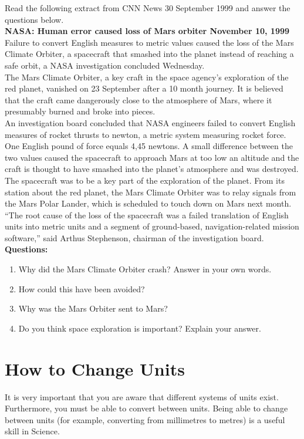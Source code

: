 {Read the following extract from CNN News 30 September 1999 and answer the questions below.\\

{\bf NASA: Human error caused loss of Mars orbiter November 10, 1999}\\

Failure to convert English measures to metric values caused the loss of the Mars Climate Orbiter, a spacecraft that smashed into the planet instead of reaching a safe orbit, a NASA investigation concluded Wednesday.\\
The Mars Climate Orbiter, a key craft in the space agency's exploration of the red planet, vanished on 23 September after a 10 month journey. It is believed that the craft came dangerously close to the atmosphere of Mars, where it presumably burned and broke into pieces.\\
An investigation board concluded that NASA engineers failed to convert English measures of rocket thrusts to newton, a metric system measuring rocket force. One English pound of force equals 4,45 newtons. A small difference between the two values caused the spacecraft to approach Mars at too low an altitude and the craft is thought to have smashed into the planet's atmosphere and was destroyed.\\
The spacecraft was to be a key part of the exploration of the planet. From its station about the red planet, the Mars Climate Orbiter was to relay signals from the Mars Polar Lander, which is scheduled to touch down on Mars next month.\\
``The root cause of the loss of the spacecraft was a failed translation of English units into metric units and a segment of ground-based, navigation-related mission software,'' said Arthus Stephenson, chairman of the investigation board.\\
{\bf Questions:}
\begin{enumerate}
\item{Why did the Mars Climate Orbiter crash? Answer in your own words.}
\item{How could this have been avoided?}
\item{Why was the Mars Orbiter sent to Mars?}
\item{Do you think space exploration is important? Explain your answer.}
\end{enumerate}
}

\section{How to Change Units}
It is very important that you are aware that different systems of units exist. Furthermore, you must be able to convert between units. Being able to change between units (for example, converting from millimetres to metres) is a useful skill in Science.

